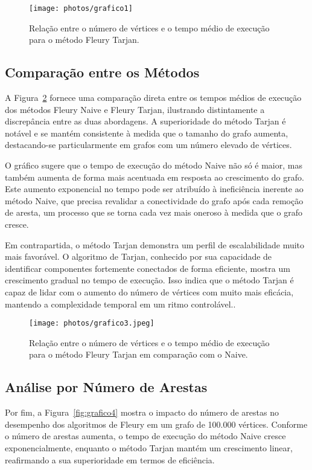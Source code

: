 \documentclass[12pt]{article}
\begin{document}
\begin{figure}[H]
    \centering
    \texttt{[image: photos/grafico1]}
    \caption{Relação entre o número de vértices e o tempo médio de execução para o método Fleury Tarjan.}
    \label{fig:grafico2}
\end{figure}

\subsection{Comparação entre os Métodos}
A Figura~\ref{fig:grafico3} fornece uma comparação direta  entre os tempos médios de execução dos métodos Fleury Naive e Fleury Tarjan, ilustrando distintamente a discrepância entre as duas abordagens. A superioridade do método Tarjan é notável e se mantém consistente à medida que o tamanho do grafo aumenta, destacando-se particularmente em grafos com um número elevado de vértices.

O gráfico sugere que o tempo de execução do método Naive não só é maior, mas também aumenta de forma mais acentuada em resposta ao crescimento do grafo. Este aumento  exponencial no tempo pode ser atribuído à ineficiência inerente ao método Naive, que precisa revalidar a conectividade do grafo após cada remoção de aresta, um processo que se torna cada vez mais oneroso à medida que o grafo cresce.

Em contrapartida, o método Tarjan demonstra um perfil de escalabilidade muito mais favorável. O algoritmo de Tarjan, conhecido por sua capacidade de identificar componentes  fortemente conectados de forma eficiente, mostra um crescimento gradual no tempo de execução. Isso indica que o método Tarjan é capaz de lidar com o aumento do número de vértices com muito mais eficácia, mantendo a complexidade temporal em um ritmo controlável..

\begin{figure}[H]
    \centering
    \texttt{[image: photos/grafico3.jpeg]}
    \caption{Relação entre o número de vértices e o tempo médio de execução para o método Fleury Tarjan em comparação com o Naive.}
    \label{fig:grafico3}
\end{figure}

\subsection{Análise por Número de Arestas}
Por fim, a Figura~\ref{fig:grafico4} mostra o impacto do número de arestas no desempenho dos algoritmos de Fleury em um grafo de 100.000 vértices. Conforme o número de arestas aumenta, o tempo de execução do método Naive cresce exponencialmente, enquanto o método Tarjan mantém um crescimento linear, reafirmando a sua superioridade em termos de eficiência.
\end{document}
